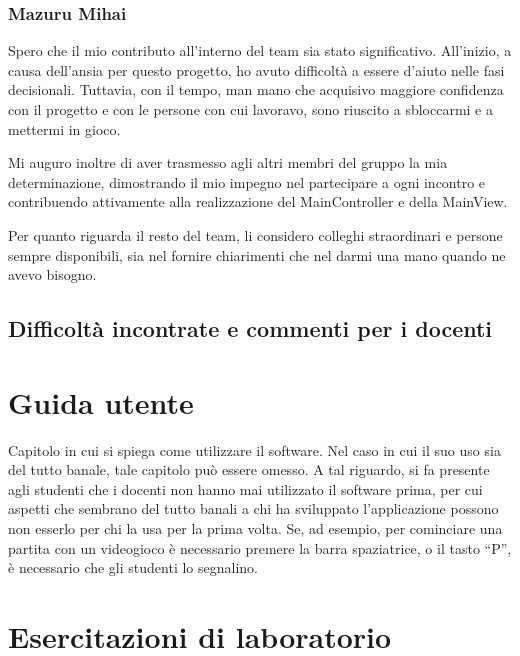 \documentclass[a4paper,12pt]{report}
\begin{document}
\subsection{Mazuru Mihai}
Spero che il mio contributo all'interno del team sia stato significativo. All'inizio, a causa dell'ansia per questo progetto, ho avuto difficoltà a essere d'aiuto nelle fasi decisionali. Tuttavia, con il tempo, man mano che acquisivo maggiore confidenza con il progetto e con le persone con cui lavoravo, sono riuscito a sbloccarmi e a mettermi in gioco.

Mi auguro inoltre di aver trasmesso agli altri membri del gruppo la mia determinazione, dimostrando il mio impegno nel partecipare a ogni incontro e contribuendo attivamente alla realizzazione del MainController e della MainView.

Per quanto riguarda il resto del team, li considero colleghi straordinari e persone sempre disponibili, sia nel fornire chiarimenti che nel darmi una mano quando ne avevo bisogno.

\section{Difficoltà incontrate e commenti per i docenti}

\appendix
\chapter{Guida utente}

Capitolo in cui si spiega come utilizzare il software. Nel caso in cui il suo uso sia del tutto
banale, tale capitolo può essere omesso.
%
A tal riguardo, si fa presente agli studenti che i docenti non hanno mai utilizzato il software
prima, per cui aspetti che sembrano del tutto banali a chi ha sviluppato l'applicazione possono non
esserlo per chi la usa per la prima volta.
%
Se, ad esempio, per cominciare una partita con un videogioco è necessario premere la barra
spaziatrice, o il tasto ``P'', è necessario che gli studenti lo segnalino.

\chapter{Esercitazioni di laboratorio}



\end{document}
